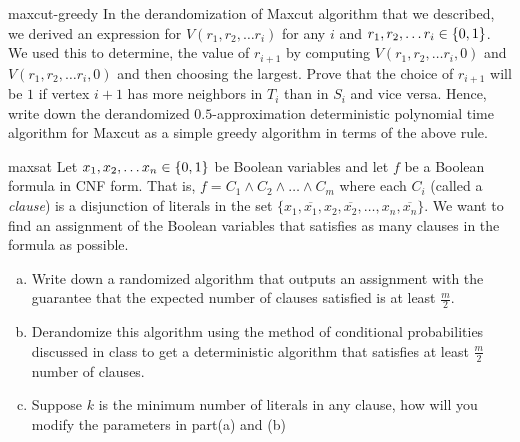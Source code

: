 \begin{exercise-prob}
\begin{show-ps1}{maxcut-greedy}
In the derandomization of {\sc Maxcut} algorithm that we described, we derived an expression for $V(r_1, r_2, \ldots r_i)$ for any $i$ and $r_1, r_2, \ldots r_i \in \{0,1\}$. We used this to determine, the value of $r_{i+1}$ by computing $V(r_1, r_2, \dots r_i, 0)$ and $V(r_1, r_2, \dots r_i, 0)$ and then choosing the largest.
Prove that the choice of $r_{i+1}$ will be $1$ if vertex $i+1$ has more neighbors in $T_i$ than in $S_i$ and vice versa. Hence, write down the derandomized $0.5$-approximation deterministic polynomial time algorithm for {\sc Maxcut} as a simple greedy algorithm in terms of the above rule.
\end{show-ps1}
\end{exercise-prob}


\begin{exercise-prob}
\begin{show-ps1}{maxsat}
Let $x_1, x_2, \ldots x_n \in \{0,1\}$ be Boolean variables and let $f$ be a Boolean formula in CNF form. That is, $f = C_1 \land C_2 \land \ldots \land C_m$ where each $C_i$ (called a {\em clause}) is a disjunction of literals in the set $\{x_1, \overline{x_1}, x_2, \overline{x_2}, \ldots, x_n, \overline{x_n} \}$. We want to find an assignment of the Boolean variables that satisfies as many clauses in the formula as possible.
\begin{enumerate}[(a)]
\item Write down a randomized algorithm that outputs an assignment with the guarantee that the expected number of clauses satisfied is at least $\frac{m}{2}$.
\item Derandomize this algorithm using the method of conditional probabilities discussed in class to get a deterministic algorithm that satisfies at least $\frac{m}{2}$ number of clauses.
\item Suppose $k$ is the minimum number of literals in any clause, how will you modify the parameters in part(a) and (b) 
\end{enumerate}
\end{show-ps1}
\end{exercise-prob}
